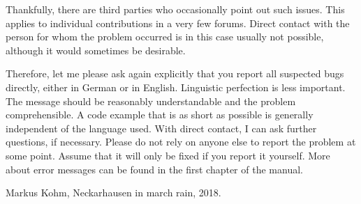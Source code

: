Thankfully, there are third parties who occasionally point out such issues.
This applies to individual contributions in a very few forums. Direct contact
with the person for whom the problem occurred is in this case usually not
possible, although it would sometimes be desirable.

Therefore, let me please ask again explicitly that you report all suspected
bugs directly, either in German or in English. Linguistic perfection is less
important. The message should be reasonably understandable and the problem
comprehensible. A code example that is as short as possible is generally
independent of the language used. With direct contact, I can ask further
questions, if necessary. Please do not rely on anyone else to report the
problem at some point. Assume that it will only be fixed if you report it
yourself. More about error messages can be found in the first chapter of the
manual.

\bigskip\noindent
Markus Kohm, Neckarhausen in march rain, 2018.

\endinput


